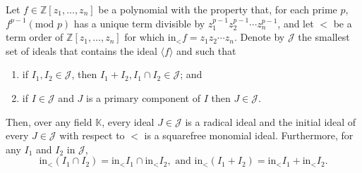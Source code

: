 \documentclass[ALCO,published]{cedram}
\numberwithin{equation}{section}
\newcommand{\1}{^{-1}}
\begin{document}




\begin{thm}
\label{thm:Knutson}
Let $f \in \mathbb{Z}[z_{1}, \ldots, z_{n}]$ be a polynomial with the property that, for each prime $p$, $f^{p-1} (\text{mod }p)$ has a unique term divisible by $z_1^{p-1}z_2^{p-1}\cdots z_n^{p-1}$, and let $<$ be a term order of $\mathbb{Z}[z_1,\dots,z_n]$ for which $\textrm{in}_<f = z_1z_2\cdots z_n$.
Denote by $\mathcal{J}$ the smallest set of ideals that contains the ideal $\langle f \rangle$
and such that 
\begin{enumerate}
\item  if $I_{1}, I_{2} \in \mathcal{J}$, then $I_{1} + I_{2}, I_{1} \cap I_{2} \in \mathcal{J}$; and
\item  if $I \in \mathcal{J}$ and $J$ is a primary component of $I$ then
$J \in \mathcal{J}$.
\end{enumerate}
Then, over any field $\mathbb{K}$, every ideal $J \in \mathcal{J}$ is a radical ideal and
the initial ideal of every $J \in \mathcal{J}$ with respect to $<$ is a squarefree monomial ideal.
Furthermore, for any $I_1$ and $I_2$ in  $\mathcal{J}$,
\[\textrm{in}_<(I_1\cap I_2) = \textrm{in}_< I_1 \cap \textrm{in}_< I_2,\textrm{ and }\textrm{in}_<(I_1+I_2) = \textrm{in}_< I_1+\textrm{in}_< I_2.\]
\end{thm}
\end{document}
